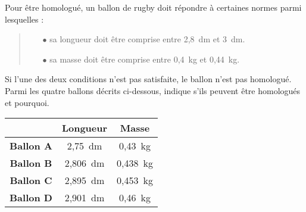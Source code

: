 Pour être homologué, un ballon de rugby doit répondre à certaines
normes parmi lesquelles :
\begin{quote}
\begin{itemize}
\item[$\bullet$] sa longueur doit être comprise entre 2,8~dm et
  3~dm.
\item[$\bullet$] sa masse doit être comprise entre 0,4~kg et
  0,44~kg.
\end{itemize}
\end{quote}
Si l'une des deux conditions n'est pas satisfaite, le ballon n'est pas
homologué.
\\Parmi les quatre ballons décrits ci-dessous, indique s'ils peuvent
être homologués et pourquoi.
\begin{center}
\begin{tabular}{|c|c|c|}
\cline{2-3}
\multicolumn{1}{c|}{}&{\bf Longueur}&{\bf Masse}\\
\hline
{\bf Ballon A}&2,75~dm&0,43~kg\\
\hline
{\bf Ballon B}&2,806~dm&0,438~kg\\
\hline
{\bf Ballon C}&2,895~dm&0,453~kg\\
\hline
{\bf Ballon D}&2,901~dm&0,46~kg\\
\hline
\end{tabular}
\end{center}